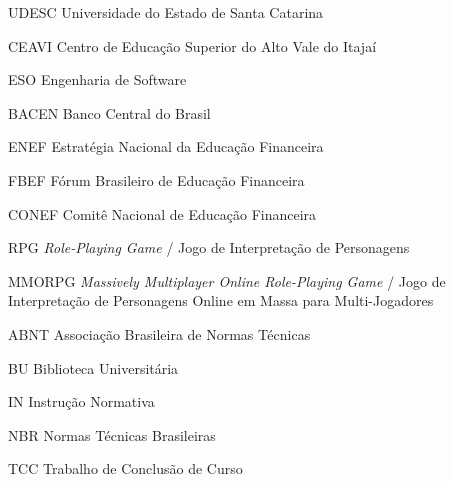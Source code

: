
\listoffigures*
\cleardoublepage



\listoftables*
\cleardoublepage

\begin{siglas}
	\item[UDESC] Universidade do Estado de Santa Catarina
	\item[CEAVI] Centro de Educação Superior do Alto Vale do Itajaí
	\item[ESO] Engenharia de Software

	\item[BACEN]  Banco Central do Brasil
	\item[ENEF]  Estratégia Nacional da Educação Financeira
	\item[FBEF]  Fórum Brasileiro de Educação Financeira
	\item[CONEF] Comitê Nacional de Educação Financeira
	\item[RPG] \textit{Role-Playing Game} / Jogo de Interpretação de Personagens
	\item[MMORPG] \textit{Massively Multiplayer Online Role-Playing Game} / Jogo de Interpretação de Personagens Online em Massa para Multi-Jogadores





	\item[ABNT] Associação Brasileira de Normas Técnicas
	\item[BU] Biblioteca Universitária
	\item[IN] Instrução Normativa
	\item[NBR] Normas Técnicas Brasileiras
	\item[TCC] Trabalho de Conclusão de Curso

\end{siglas}
